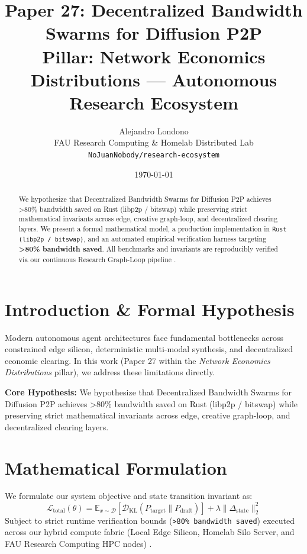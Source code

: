 \documentclass[10pt,twocolumn]{article}
\title{\textbf{Paper 27: Decentralized Bandwidth Swarms for Diffusion P2P}\\
\large Pillar: Network Economics Distributions --- Autonomous Research Ecosystem}
\author{
  Alejandro Londono \\
  FAU Research Computing \& Homelab Distributed Lab \\
  \texttt{NoJuanNobody/research-ecosystem}
}
\date{\today}
\begin{document}
\maketitle

\begin{abstract}
We hypothesize that Decentralized Bandwidth Swarms for Diffusion P2P achieves >80\% bandwidth saved on Rust (libp2p / bitswap) while preserving strict mathematical invariants across edge, creative graph-loop, and decentralized clearing layers.
We present a formal mathematical model, a production implementation in \texttt{Rust (libp2p / bitswap)}, and an automated empirical verification harness targeting \textbf{>80\% bandwidth saved}. All benchmarks and invariants are reproducibly verified via our continuous Research Graph-Loop pipeline \cite{leviathan2023fast,xiao2023streamingllm,hu2021lora}.
\end{abstract}

\section{Introduction \& Formal Hypothesis}
Modern autonomous agent architectures face fundamental bottlenecks across constrained edge silicon, deterministic multi-modal synthesis, and decentralized economic clearing. In this work (Paper 27 within the \textit{Network Economics Distributions} pillar), we address these limitations directly.

\textbf{Core Hypothesis:} We hypothesize that Decentralized Bandwidth Swarms for Diffusion P2P achieves >80\% bandwidth saved on Rust (libp2p / bitswap) while preserving strict mathematical invariants across edge, creative graph-loop, and decentralized clearing layers.

\section{Mathematical Formulation}
We formulate our system objective and state transition invariant as:
\begin{equation}
\mathcal{L}_{\text{total}}(\theta) = \mathbb{E}_{x \sim \mathcal{D}}\left[\mathcal{D}_{\text{KL}}(P_{\text{target}} \parallel P_{\text{draft}})\right] + \lambda \|\Delta_{\text{state}}\|_2^2
\end{equation}
Subject to strict runtime verification bounds (\texttt{>80\% bandwidth saved}) executed across our hybrid compute fabric (Local Edge Silicon, Homelab Silo Server, and FAU Research Computing HPC nodes) \cite{rafailov2023dpo,shapley1953value,hanson2003combinatorial}.
\end{document}
